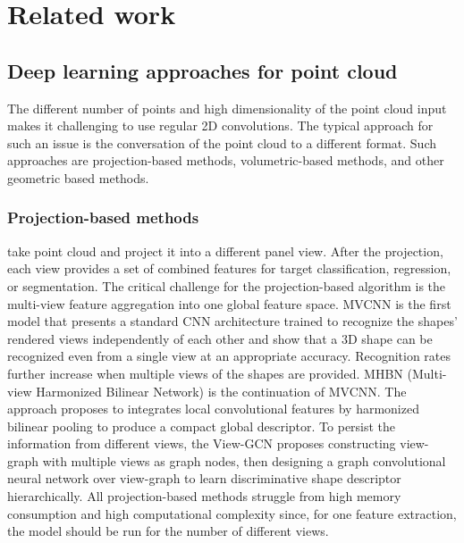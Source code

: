 \chapter{Related work}

\label{Related work}

\section{Deep learning approaches for point cloud}
The different number of points and high dimensionality of the point cloud input makes it challenging to use regular 2D convolutions. The typical approach for such an issue is the conversation of the point cloud to a different format. Such approaches are projection-based methods, volumetric-based methods, and other geometric based methods.
\subsection{Projection-based methods} take point cloud and project it into a different panel view. After the projection, each view provides a set of combined features for target classification, regression, or segmentation. The critical challenge for the projection-based algorithm is the multi-view feature aggregation into one global feature space.
MVCNN \parencite{su_multi-view_2015} is the first model that presents a standard CNN architecture trained to recognize the shapes' rendered views independently of each other and show that a 3D shape can be recognized even from a single view at an appropriate accuracy. Recognition rates further increase when multiple views of the shapes are provided.
MHBN \parencite{yu_multi-view_2018} (Multi-view Harmonized Bilinear Network) is the continuation of MVCNN. The approach proposes to integrates local convolutional features by harmonized bilinear pooling to produce a compact global descriptor.
To persist the information from different views, the View-GCN \parencite{wei_view-gcn_2020} proposes constructing view-graph with multiple views as graph nodes, then designing a graph convolutional neural network over view-graph to learn discriminative shape descriptor hierarchically.
All projection-based methods struggle from high memory consumption and high computational complexity since, for one feature extraction, the model should be run for the number of different views.

